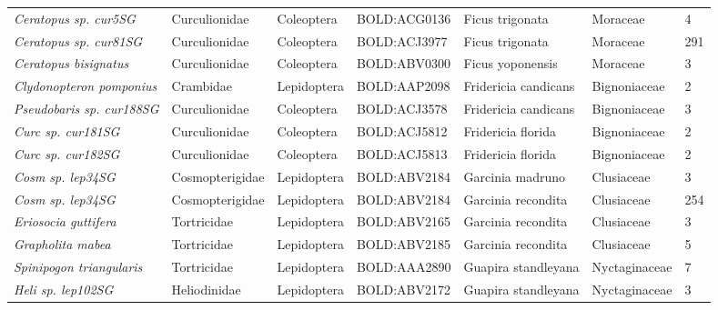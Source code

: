 \documentclass[11pt]{article}
\begin{document}
\begin{landscape}
\begin{longtable}{@{}lllllll@{}}
\textit{Ceratopus sp. cur5SG}                         & Curculionidae   & Coleoptera   & BOLD:ACG0136 & Ficus trigonata                    & Moraceae         & 4     \\
\textit{Ceratopus sp. cur81SG}                        & Curculionidae   & Coleoptera   & BOLD:ACJ3977 & Ficus trigonata                    & Moraceae         & 291   \\
\textit{Ceratopus bisignatus}                         & Curculionidae   & Coleoptera   & BOLD:ABV0300 & Ficus yoponensis                   & Moraceae         & 3     \\
\textit{Clydonopteron pomponius}                      & Crambidae       & Lepidoptera  & BOLD:AAP2098 & Fridericia candicans               & Bignoniaceae     & 2     \\
\textit{Pseudobaris sp. cur188SG}                     & Curculionidae   & Coleoptera   & BOLD:ACJ3578 & Fridericia candicans               & Bignoniaceae     & 3     \\
\textit{Curc sp. cur181SG}                            & Curculionidae   & Coleoptera   & BOLD:ACJ5812 & Fridericia florida                 & Bignoniaceae     & 2     \\
\textit{Curc sp. cur182SG}                            & Curculionidae   & Coleoptera   & BOLD:ACJ5813 & Fridericia florida                 & Bignoniaceae     & 2     \\
\textit{Cosm sp. lep34SG}                             & Cosmopterigidae & Lepidoptera  & BOLD:ABV2184 & Garcinia madruno                   & Clusiaceae       & 3     \\
\textit{Cosm sp. lep34SG}                             & Cosmopterigidae & Lepidoptera  & BOLD:ABV2184 & Garcinia recondita                 & Clusiaceae       & 254   \\
\textit{Eriosocia guttifera}                          & Tortricidae     & Lepidoptera  & BOLD:ABV2165 & Garcinia recondita                 & Clusiaceae       & 3     \\
\textit{Grapholita mabea}                             & Tortricidae     & Lepidoptera  & BOLD:ABV2185 & Garcinia recondita                 & Clusiaceae       & 5     \\
\textit{Spinipogon triangularis}                      & Tortricidae     & Lepidoptera  & BOLD:AAA2890 & Guapira standleyana                & Nyctaginaceae    & 7     \\
\textit{Heli sp. lep102SG}                            & Heliodinidae    & Lepidoptera  & BOLD:ABV2172 & Guapira standleyana                & Nyctaginaceae    & 3     \\

\end{longtable}
\end{landscape}
\end{document}
